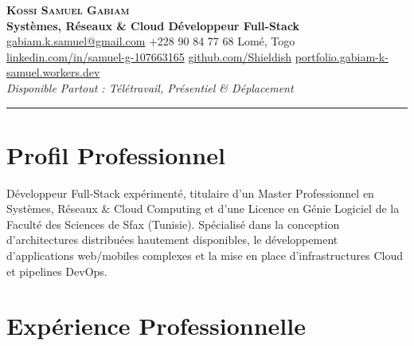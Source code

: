\documentclass[11pt, a4paper]{article}
\begin{document}
\color{black} %

\begin{center}
  {\Huge\bfseries\scshape Kossi Samuel Gabiam}\\[6pt]
  {\large\bfseries Systèmes, Réseaux \& Cloud \textbullet{} Développeur Full-Stack}\\[8pt]
  \small
  \href{mailto:gabiam.k.samuel@gmail.com}{gabiam.k.samuel@gmail.com}
  \quad\textbullet\quad
  +228 90 84 77 68
  \quad\textbullet\quad
  Lomé, Togo\\[3pt]
  \href{https://www.linkedin.com/in/samuel-g-107663165/}{linkedin.com/in/samuel-g-107663165}
  \quad\textbullet\quad
  \href{https://github.com/Shieldish}{github.com/Shieldish}
  \quad\textbullet\quad
  \href{https://portfolio.gabiam-k-samuel.workers.dev/}{portfolio.gabiam-k-samuel.workers.dev}\\[4pt]
  {\small\color{secondary}\textit{Disponible Partout : Télétravail, Présentiel \& Déplacement}}
\end{center}

\vspace{-2pt}
\noindent\rule{\linewidth}{1pt}
\vspace{6pt}

\section{Profil Professionnel}

Développeur Full-Stack expérimenté, titulaire d'un Master Professionnel en Systèmes, Réseaux \& Cloud Computing et d'une Licence en Génie Logiciel de la Faculté des Sciences de Sfax (Tunisie). Spécialisé dans la conception d'architectures distribuées hautement disponibles, le développement d'applications web/mobiles complexes et la mise en place d'infrastructures Cloud et pipelines DevOps.

\section{Expérience Professionnelle}
\end{document}
